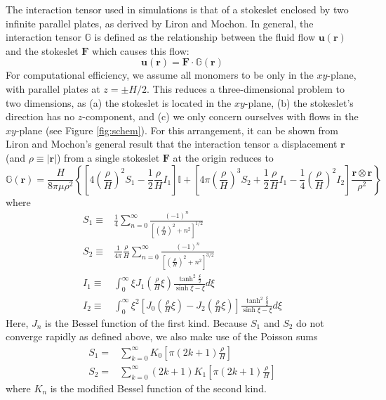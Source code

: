 \documentclass[11pt]{ucthesis}
\begin{document}
The interaction tensor used in simulations is that of a stokeslet enclosed by two infinite parallel plates, as derived by Liron and Mochon\cite{Liron1976}. In general, the interaction tensor $\mathbb{G}$ is defined as the relationship between the fluid flow $\mathbf{u(r)}$ and the stokeslet $\mathbf{F}$ which causes this flow:
\begin{equation}
\label{eq:oseen}
\mathbf{u(r)} = \mathbf{F}\cdot\mathbb{G}(\mathbf{r})
\end{equation}
For computational efficiency, we assume all monomers to be only in
the $xy$-plane, with parallel plates at $z = \pm H/2$. This reduces
a three-dimensional problem to two dimensions, as (a) the stokeslet
is located in the $xy$-plane, (b) the stokeslet's direction has no
$z$-component, and (c) we only concern ourselves with flows in the
$xy$-plane (see Figure \ref{fig:schem}). For
this arrangement, it can be shown from Liron and Mochon's general
result that the interaction tensor a displacement $\mathbf{r}$ (and
$\rho\equiv|\mathbf{r}|$) from a single stokeslet $\mathbf{F}$ at
the origin reduces to
\begin{equation}
\label{eq:uab}
\mathbb{G}(\mathbf{r}) = \frac{H}{8\pi\mu\rho^2}\left\{\left[4\left(\frac\rho H\right)^2 S_1 - \frac12\frac\rho H I_1\right]\mathbb{I}+\left[4\pi\left(\frac{\rho}{H}\right)^3 S_2 + \frac{1}{2}\frac\rho H I_1 -\frac14\left(\frac\rho H\right)^2 I_2\right]\frac{\mathbf{r\otimes r}}{\rho^2}\right\}
\end{equation}
where
\begin{align*}
S_1\equiv&\frac14\sum_{n=0}^\infty \frac{(-1)^n}{\left[\left(\frac{\rho}{H}\right)^2 + n^2\right]^{1/2}}\\
S_2\equiv&\frac{1}{4\pi}\frac\rho H\sum_{n=0}^\infty \frac{(-1)^n}{\left[\left(\frac{\rho}{H}\right)^2 + n^2\right]^{3/2}}\\
I_1\equiv&\int_0^\infty \xi J_1\left(\frac\rho H \xi\right)\frac{\tanh^2\frac\xi 2}{\sinh\xi - \xi}d\xi\\
I_2\equiv&\int_0^\infty \xi^2\left[J_0\left(\frac\rho H \xi\right) -J_2\left(\frac\rho H \xi\right)\right]\frac{\tanh^2\frac\xi 2}{\sinh\xi - \xi}d\xi
\end{align*}
Here, $J_n$ is the Bessel function of the first kind. Because $S_1$ and $S_2$ do not converge rapidly as defined above, we also make use of the Poisson sums
\begin{align*}
S_1 =& \sum_{k=0}^\infty K_0\left[\pi(2k+1)\frac\rho H\right]\\
S_2 =& \sum_{k=0}^\infty (2k+1) K_1\left[\pi(2k+1)\frac\rho H\right]
\end{align*}
where $K_n$ is the modified Bessel function of the second kind.
\end{document}
